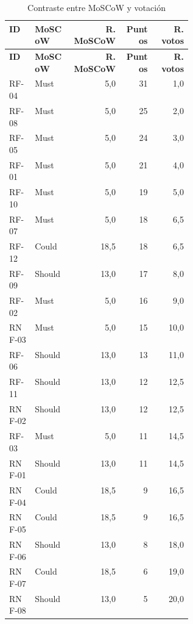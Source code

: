 \begingroup
\small
\begin{longtable}{@{}p{0.14\linewidth}p{0.21\linewidth}rrr@{}}
\caption{Contraste entre MoSCoW y votación}\label{tab:comparacion-moscow-votos}\\
\toprule
\textbf{ID} & \textbf{MoSCoW} & \textbf{R. MoSCoW} & \textbf{Puntos} & \textbf{R. votos}\\
\midrule
\endfirsthead
\toprule
\textbf{ID} & \textbf{MoSCoW} & \textbf{R. MoSCoW} & \textbf{Puntos} & \textbf{R. votos}\\
\midrule
\endhead
\bottomrule
\endlastfoot
RF-04 & Must & 5,0 & 31 & 1,0\\
RF-08 & Must & 5,0 & 25 & 2,0\\
RF-05 & Must & 5,0 & 24 & 3,0\\
RF-01 & Must & 5,0 & 21 & 4,0\\
RF-10 & Must & 5,0 & 19 & 5,0\\
RF-07 & Must & 5,0 & 18 & 6,5\\
RF-12 & Could & 18,5 & 18 & 6,5\\
RF-09 & Should & 13,0 & 17 & 8,0\\
RF-02 & Must & 5,0 & 16 & 9,0\\
RNF-03 & Must & 5,0 & 15 & 10,0\\
RF-06 & Should & 13,0 & 13 & 11,0\\
RF-11 & Should & 13,0 & 12 & 12,5\\
RNF-02 & Should & 13,0 & 12 & 12,5\\
RF-03 & Must & 5,0 & 11 & 14,5\\
RNF-01 & Should & 13,0 & 11 & 14,5\\
RNF-04 & Could & 18,5 & 9 & 16,5\\
RNF-05 & Could & 18,5 & 9 & 16,5\\
RNF-06 & Should & 13,0 & 8 & 18,0\\
RNF-07 & Could & 18,5 & 6 & 19,0\\
RNF-08 & Should & 13,0 & 5 & 20,0\\
\end{longtable}
\endgroup

